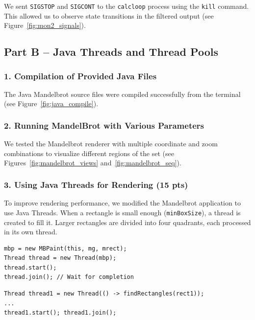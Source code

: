 \documentclass[a4paper,12pt]{article}
\begin{document}
We sent \texttt{SIGSTOP} and \texttt{SIGCONT} to the \texttt{calcloop} process using the \texttt{kill} command. This allowed us to observe state transitions in the filtered output (see Figure~\ref{fig:mon2_signals}).

\subsection{Part B – Java Threads and Thread Pools}

\subsubsection*{1. Compilation of Provided Java Files}

The Java Mandelbrot source files were compiled successfully from the terminal (see Figure~\ref{fig:java_compile}).

\subsubsection*{2. Running MandelBrot with Various Parameters}

We tested the Mandelbrot renderer with multiple coordinate and zoom combinations to visualize different regions of the set (see Figures~\ref{fig:mandelbrot_views} and~\ref{fig:mandelbrot_seq}).

\subsubsection*{3. Using Java Threads for Rendering (15 pts)}

To improve rendering performance, we modified the Mandelbrot application to use Java Threads. When a rectangle is small enough (\texttt{minBoxSize}), a thread is created to fill it. Larger rectangles are divided into four quadrants, each processed in its own thread.

\begin{lstlisting}[caption=Using Java Threads to fill Mandelbrot rectangles]
mbp = new MBPaint(this, mg, mrect);
Thread thread = new Thread(mbp);
thread.start();
thread.join(); // Wait for completion
\end{lstlisting}

\begin{lstlisting}[caption=Recursive quadrant threading]
Thread thread1 = new Thread(() -> findRectangles(rect1));
...
thread1.start(); thread1.join();
\end{lstlisting}
\end{document}
